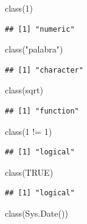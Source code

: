 \documentclass[
]{book}
\newenvironment{Shaded}{\begin{snugshade}}{\end{snugshade}}
\newcommand{\ConstantTok}[1]{\textcolor[rgb]{0.00,0.00,0.00}{#1}}
\newcommand{\DecValTok}[1]{\textcolor[rgb]{0.00,0.00,0.81}{#1}}
\newcommand{\FunctionTok}[1]{\textcolor[rgb]{0.00,0.00,0.00}{#1}}
\newcommand{\NormalTok}[1]{#1}
\newcommand{\SpecialCharTok}[1]{\textcolor[rgb]{0.00,0.00,0.00}{#1}}
\newcommand{\StringTok}[1]{\textcolor[rgb]{0.31,0.60,0.02}{#1}}
\begin{document}
\begin{Shaded}
\begin{Highlighting}[]
\FunctionTok{class}\NormalTok{(}\DecValTok{1}\NormalTok{)}
\end{Highlighting}
\end{Shaded}

\begin{verbatim}
## [1] "numeric"
\end{verbatim}

\begin{Shaded}
\begin{Highlighting}[]
\FunctionTok{class}\NormalTok{(}\StringTok{"palabra"}\NormalTok{)}
\end{Highlighting}
\end{Shaded}

\begin{verbatim}
## [1] "character"
\end{verbatim}

\begin{Shaded}
\begin{Highlighting}[]
\FunctionTok{class}\NormalTok{(sqrt)}
\end{Highlighting}
\end{Shaded}

\begin{verbatim}
## [1] "function"
\end{verbatim}

\begin{Shaded}
\begin{Highlighting}[]
\FunctionTok{class}\NormalTok{(}\DecValTok{1} \SpecialCharTok{!=} \DecValTok{1}\NormalTok{)}
\end{Highlighting}
\end{Shaded}

\begin{verbatim}
## [1] "logical"
\end{verbatim}

\begin{Shaded}
\begin{Highlighting}[]
\FunctionTok{class}\NormalTok{(}\ConstantTok{TRUE}\NormalTok{)}
\end{Highlighting}
\end{Shaded}

\begin{verbatim}
## [1] "logical"
\end{verbatim}

\begin{Shaded}
\begin{Highlighting}[]
\FunctionTok{class}\NormalTok{(}\FunctionTok{Sys.Date}\NormalTok{())}
\end{Highlighting}
\end{Shaded}
\end{document}
